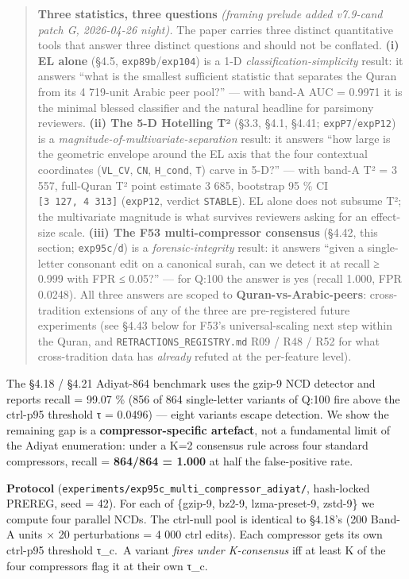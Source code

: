 \documentclass[
]{article}
\begin{document}
\begin{quote}
\textbf{Three statistics, three questions} \emph{(framing prelude added
v7.9-cand patch G, 2026-04-26 night).} The paper carries three distinct
quantitative tools that answer three distinct questions and should not
be conflated. \textbf{(i) EL alone} (§4.5,
\texttt{exp89b}/\texttt{exp104}) is a 1-D
\emph{classification-simplicity} result: it answers ``what is the
smallest sufficient statistic that separates the Quran from its 4
719-unit Arabic peer pool?'' --- with band-A AUC = 0.9971 it is the
minimal blessed classifier and the natural headline for parsimony
reviewers. \textbf{(ii) The 5-D Hotelling T²} (§3.3, §4.1, §4.41;
\texttt{expP7}/\texttt{expP12}) is a
\emph{magnitude-of-multivariate-separation} result: it answers ``how
large is the geometric envelope around the EL axis that the four
contextual coordinates (\texttt{VL\_CV}, \texttt{CN}, \texttt{H\_cond},
\texttt{T}) carve in 5-D?'' --- with band-A T² = 3 557, full-Quran T²
point estimate 3 685, bootstrap 95 \% CI \texttt{{[}3\ 127,\ 4\ 313{]}}
(\texttt{expP12}, verdict \texttt{STABLE}). EL alone does not subsume
T²; the multivariate magnitude is what survives reviewers asking for an
effect-size scale. \textbf{(iii) The F53 multi-compressor consensus}
(§4.42, this section; \texttt{exp95c}/\texttt{d}) is a
\emph{forensic-integrity} result: it answers ``given a single-letter
consonant edit on a canonical surah, can we detect it at recall ≥ 0.999
with FPR ≤ 0.05?'' --- for Q:100 the answer is yes (recall 1.000, FPR
0.0248). All three answers are scoped to \textbf{Quran-vs-Arabic-peers}:
cross-tradition extensions of any of the three are pre-registered future
experiments (see §4.43 below for F53's universal-scaling next step
within the Quran, and \texttt{RETRACTIONS\_REGISTRY.md} R09 / R48 / R52
for what cross-tradition data has \emph{already} refuted at the
per-feature level).
\end{quote}

The §4.18 / §4.21 Adiyat-864 benchmark uses the gzip-9 NCD detector and
reports recall = 99.07 \% (856 of 864 single-letter variants of Q:100
fire above the ctrl-p95 threshold τ = 0.0496) --- eight variants escape
detection. We show the remaining gap is a \textbf{compressor-specific
artefact}, not a fundamental limit of the Adiyat enumeration: under a
K=2 consensus rule across four standard compressors, recall =
\textbf{864/864 = 1.000} at half the false-positive rate.

\textbf{Protocol}
(\texttt{experiments/exp95c\_multi\_compressor\_adiyat/}, hash-locked
PREREG, seed = 42). For each of \{gzip-9, bz2-9, lzma-preset-9, zstd-9\}
we compute four parallel NCDs. The ctrl-null pool is identical to
§4.18's (200 Band-A units × 20 perturbations = 4 000 ctrl edits). Each
compressor gets its own ctrl-p95 threshold τ\_c.~A variant \emph{fires
under K-consensus} iff at least K of the four compressors flag it at
their own τ\_c.
\end{document}
